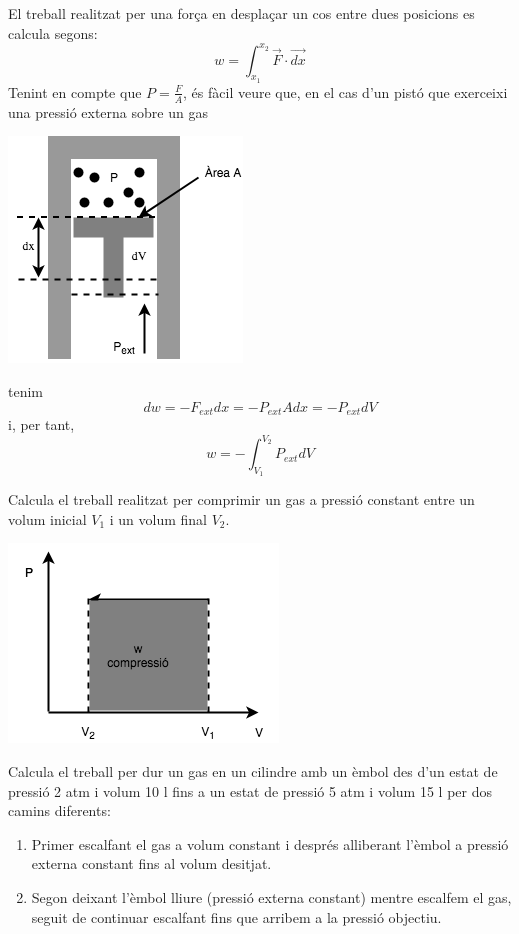 El treball realitzat per una força en desplaçar un cos entre dues posicions es calcula segons:
\[
w=\int_{x_1}^{x_2} \vec{F} \cdot \vec{dx}
\]
Tenint en compte que $P=\frac{F}{A}$, és fàcil veure que, en el cas d'un pistó que exerceixi una pressió externa sobre un gas 
\begin{center}
\includegraphics[scale=0.8]{figures/pisto_dw.png}
\end{center}
tenim
\[
dw=-F_{ext}dx = -P_{ext} A dx = -P_{ext} dV
\]
i, per tant,
\[
w=-\int_{V_1}^{V_2} P_{ext} dV
\]
\begin{exr}
Calcula el treball realitzat per comprimir un gas a pressió constant entre un volum inicial $V_1$ i un volum final $V_2$.
\begin{center}
\includegraphics[scale=0.8]{figures/wV.png}
\end{center}
\end{exr}
\begin{exr}
Calcula el treball per dur un gas en un cilindre amb un èmbol des d'un estat de pressió 2 atm i volum 10 l fins a un estat de pressió 5 atm i volum 15 l per dos camins diferents:
\begin{enumerate}
\item Primer escalfant el gas a volum constant i després alliberant l'èmbol a pressió externa constant fins al volum desitjat.
\item Segon deixant l'èmbol lliure (pressió externa constant) mentre escalfem el gas, seguit de continuar escalfant fins que arribem a la pressió objectiu.  
\end{enumerate}
\end{exr}
